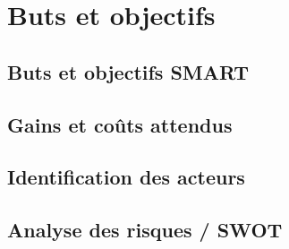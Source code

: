 \section{Buts et objectifs}

\subsection{Buts et objectifs SMART}

\subsection{Gains et coûts attendus}

\subsection{Identification des acteurs}

\subsection{Analyse des risques / SWOT}